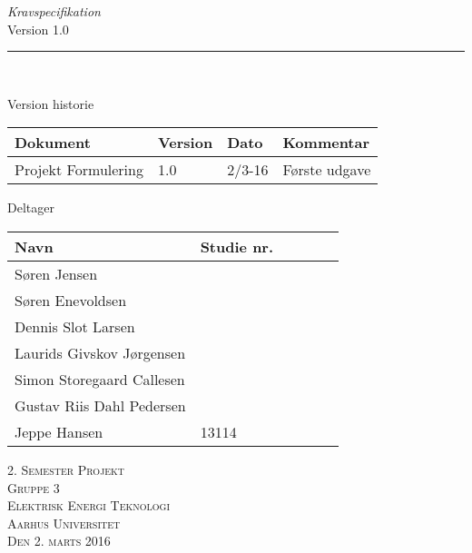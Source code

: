 \thispagestyle{empty}
\begin{flushright}
\vspace{3cm}

\phantom{hul}

\phantom{hul}

\phantom{hul}

\textsl{\Huge Kravspecifikation} \\ %
Version 1.0

\rule{16cm}{3mm} \\ \vspace{1.5cm}
\vspace{1cm}


\begin{table}[H] 
\flushleft
Version historie \\
	\begin{tabular}{|l|l|l|l|} %
		
																			 \hline
		Dokument				& Version   & Dato   	& Kommentar 	 \\ \hline 	%
		Projekt Formulering 	& 1.0   	& 2/3-16 	& Første udgave	 \\ \hline 
		
	\end{tabular} 
\end{table}

\begin{table}[H] 
	\flushleft
\phantom{hul}

\phantom{hul}
	Deltager
	
	\begin{tabular}{|l|l|l|l|l|l|} %
		\hline 	%
		Navn						&Studie nr.		\\ \hline 	%
		Søren Jensen	 			& 		   		\\ \hline 
		Søren Enevoldsen 			&				\\ \hline
		Dennis Slot Larsen			&				\\ \hline
		Laurids Givskov Jørgensen	&				\\ \hline
		Simon Storegaard Callesen	&				\\ \hline
		Gustav Riis Dahl Pedersen	&				\\ \hline
		Jeppe Hansen				&13114			\\ \hline
		
	\end{tabular} 
\end{table}




\vspace{2cm} 
\textsc{\Large 2. Semester Projekt \\
Gruppe 3 \\
Elektrisk Energi Teknologi \\
Aarhus Universitet \\
Den 2. marts 2016 \\}
\end{flushright}